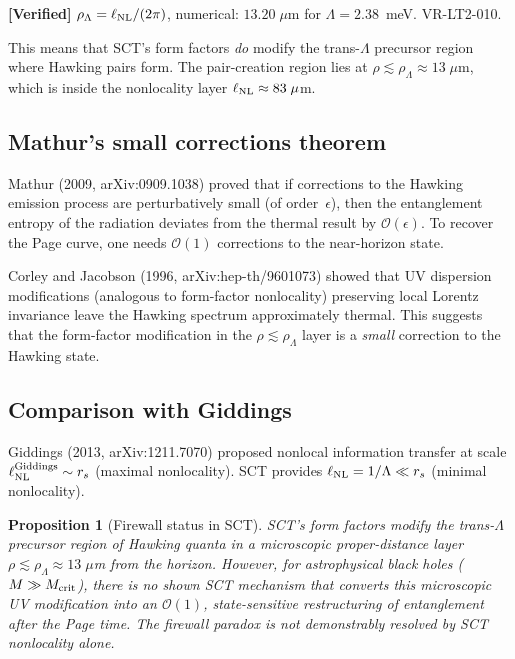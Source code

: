 \documentclass[11pt,a4paper]{article}
\renewcommand{\order}{\mathcal{O}}
\theoremstyle{plain}
\newtheorem{proposition}[theorem]{Proposition}
\theoremstyle{definition}
\newcommand{\verified}[1]{%
  \par\smallskip\noindent
  \colorbox{green!10}{\parbox{\dimexpr\linewidth-2\fboxsep}{%
    \textcolor{green!50!black}{\textbf{[Verified]}} #1}}%
  \par\smallskip}
\begin{document}
\verified{$\rho_\Lambda = \ell_{\rm NL}/(2\pi)$, numerical:
  $13.20\;\mu$m for $\Lambda = 2.38$~meV.
  VR-LT2-010.}

This means that SCT's form factors \emph{do} modify the trans-$\Lambda$
precursor region where Hawking pairs form.  The pair-creation region lies
at $\rho \lesssim \rho_\Lambda \approx 13\;\mu$m, which is inside the
nonlocality layer $\ell_{\rm NL} \approx 83\;\mu$m.

\subsection{Mathur's small corrections theorem}

Mathur (2009, arXiv:0909.1038) proved that if corrections to the
Hawking emission process are perturbatively small (of order~$\epsilon$),
then the entanglement entropy of the radiation deviates from the
thermal result by $\order(\epsilon)$.  To recover the Page curve,
one needs $\order(1)$ corrections to the near-horizon state.

Corley and Jacobson (1996, arXiv:hep-th/9601073) showed that UV
dispersion modifications (analogous to form-factor nonlocality)
preserving local Lorentz invariance leave the Hawking spectrum
approximately thermal.  This suggests that the form-factor
modification in the $\rho \lesssim \rho_\Lambda$ layer is
a \emph{small} correction to the Hawking state.

\subsection{Comparison with Giddings}

Giddings (2013, arXiv:1211.7070) proposed nonlocal information transfer
at scale $\ell_{\rm NL}^{\rm Giddings} \sim r_s$ (maximal nonlocality).
SCT provides $\ell_{\rm NL} = 1/\Lambda \ll r_s$ (minimal nonlocality).

\begin{proposition}[Firewall status in SCT]
\label{prop:firewall}
SCT's form factors modify the trans-$\Lambda$ precursor region of
Hawking quanta in a microscopic proper-distance layer
$\rho \lesssim \rho_\Lambda \approx 13\;\mu$m from the horizon.
However, for astrophysical black holes ($M \gg M_{\rm crit}$), there
is no shown SCT mechanism that converts this microscopic UV modification
into an $\order(1)$, state-sensitive restructuring of entanglement
after the Page time.  The firewall paradox is not demonstrably resolved
by SCT nonlocality alone.
\end{proposition}
\end{document}
